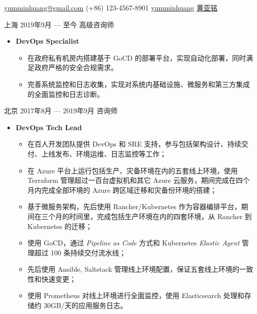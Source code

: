 \documentclass{resume}
\begin{document}
{\href{mailto:yumminhuang@gmail.com}{yumminhuang@gmail.com}}
{(+86) 123-4567-8901}
{\href{https://github.com/yumminhuang}{yumminhuang}}
{\href{https://www.linkedin.com/in/yaming-huang-6a09325b/zh-cn}{黄亚铭}}
{}

\begin{body}
	{上海}
	{2019年9月 --- 至今}
	{高级咨询师}
	\begin{itemize}
		\item {} \textbf{DevOps Specialist}
		\begin{itemize}[noitemsep,topsep=0pt]
			\item 在政府私有机房内搭建基于 GoCD 的部署平台，实现自动化部署，同时满足政府严格的安全合规需求。
			\item 完善系统监控和日志收集，实现对系统内基础设施、微服务和第三方集成的全面监控和日志诊断。
		\end{itemize}
	\end{itemize}
	{北京}
	{2017年8月 --- 2019年9月}
	{咨询师}
	\begin{itemize}
		\item {} \textbf{DevOps Tech Lead}
		\begin{itemize}[noitemsep,topsep=0pt]
			\item 在百人开发团队提供 DevOps 和 SRE 支持，参与包括架构设计、持续交付、上线发布、环境运维、日志监控等工作；
			\item 在 Azure 平台上运行包括生产、灾备环境在内的五套线上环境，使用 Terraform 管理超过一百台虚拟机和其它 Azure 云服务，期间完成在四个月内完成全部环境的 Azure 跨区域迁移和灾备份环境的搭建；
			\item 基于微服务架构，先后使用 Rancher/Kubernetes 作为容器编排平台，期间在三个月的时间里，完成包括生产环境在内的四套环境，从 Rancher 到 Kubernetes 的迁移；
			\item 使用 GoCD，通过 \textit{Pipeline as Code} 方式和 Kubernetes \textit{Elastic Agent} 管理超过 100 条持续交付流水线；
			\item 先后使用 Ansible, Saltstack 管理线上环境配置，保证五套线上环境的一致性和快速变更；
			\item 使用 Prometheus 对线上环境进行全面监控，使用 Elasticsearch 处理和存储约 30GB/天的应用服务日志。
		\end{itemize}
	\end{itemize}
\end{body}
\end{document}
